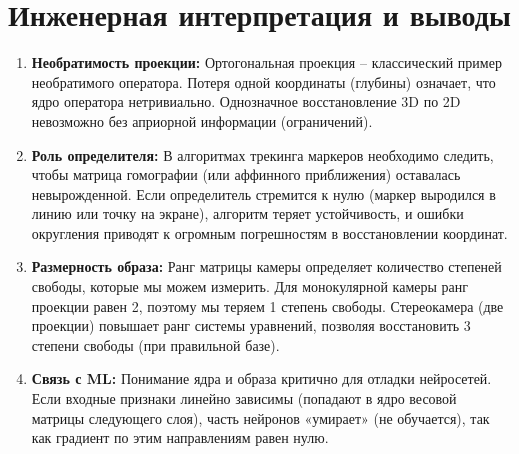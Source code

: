 \documentclass[a4paper,12pt]{article}
\begin{document}
\section{Инженерная интерпретация и выводы}
\begin{enumerate}[label=\arabic*.]
    \item \textbf{Необратимость проекции:} Ортогональная проекция -- классический пример необратимого оператора. Потеря одной координаты (глубины) означает, что ядро оператора нетривиально. Однозначное восстановление 3D по 2D невозможно без априорной информации (ограничений).
    \item \textbf{Роль определителя:} В алгоритмах трекинга маркеров необходимо следить, чтобы матрица гомографии (или аффинного приближения) оставалась невырожденной. Если определитель стремится к нулю (маркер выродился в линию или точку на экране), алгоритм теряет устойчивость, и ошибки округления приводят к огромным погрешностям в восстановлении координат.
    \item \textbf{Размерность образа:} Ранг матрицы камеры определяет количество степеней свободы, которые мы можем измерить. Для монокулярной камеры ранг проекции равен 2, поэтому мы теряем 1 степень свободы. Стереокамера (две проекции) повышает ранг системы уравнений, позволяя восстановить 3 степени свободы (при правильной базе).
    \item \textbf{Связь с ML:} Понимание ядра и образа критично для отладки нейросетей. Если входные признаки линейно зависимы (попадают в ядро весовой матрицы следующего слоя), часть нейронов «умирает» (не обучается), так как градиент по этим направлениям равен нулю.
\end{enumerate}
\end{document}
